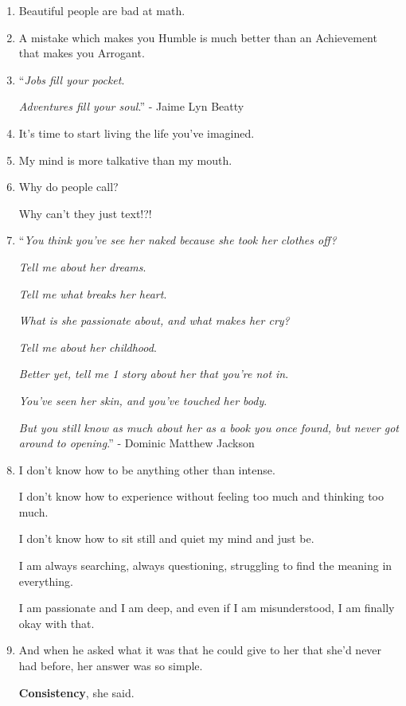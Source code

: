 \documentclass{article}
\numberwithin{equation}{section}
\begin{document}
\begin{enumerate}
    \textbf{Maybe you're a lot more} wonderful, beautiful and special than you ever give yourself credit for.
    \item Beautiful people are bad at math.
    \item A mistake which makes you Humble is much better than an Achievement that makes you Arrogant.
    \item ``\textit{Jobs fill your pocket}.
    
    \textit{Adventures fill your soul}.'' - Jaime Lyn Beatty
    \item It's time to start living the life you've imagined.
    \item My mind is more talkative than my mouth.
    \item Why do people call?
    
    Why can't they just text!?!
    \item ``\textit{You think you've see her naked because she took her clothes off?}
    
    \textit{Tell me about her dreams}.
    
    \textit{Tell me what breaks her heart}.
    
    \textit{What is she passionate about, and what makes her cry?}
    
    \textit{Tell me about her childhood}.
    
    \textit{Better yet, tell me 1 story about her that you're not in}.
    
    \textit{You've seen her skin, and you've touched her body}.
    
    \textit{But you still know as much about her as a book you once found, but never got around to opening}.'' - Dominic Matthew Jackson
    \item I don't know how to be anything other than intense.
    
    I don't know how to experience without feeling too much and thinking too much.
    
    I don't know how to sit still and quiet my mind and just be.
    
    I am always searching, always questioning, struggling to find the meaning in everything.
    
    I am passionate and I am deep, and even if I am misunderstood, I am finally okay with that.
    \item And when he asked what it was that he could give to her that she'd never had before, her answer was so simple.
    
    \textbf{Consistency}, she said.
    

\end{enumerate}
\end{document}
